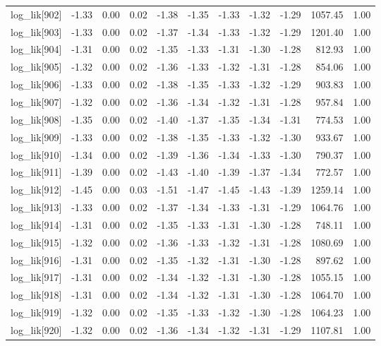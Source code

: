 \begin{table}[ht]
\begin{tabular}{rrrrrrrrrrr}
  log\_lik[902] & -1.33 & 0.00 & 0.02 & -1.38 & -1.35 & -1.33 & -1.32 & -1.29 & 1057.45 & 1.00 \\ 
  log\_lik[903] & -1.33 & 0.00 & 0.02 & -1.37 & -1.34 & -1.33 & -1.32 & -1.29 & 1201.40 & 1.00 \\ 
  log\_lik[904] & -1.31 & 0.00 & 0.02 & -1.35 & -1.33 & -1.31 & -1.30 & -1.28 & 812.93 & 1.00 \\ 
  log\_lik[905] & -1.32 & 0.00 & 0.02 & -1.36 & -1.33 & -1.32 & -1.31 & -1.28 & 854.06 & 1.00 \\ 
  log\_lik[906] & -1.33 & 0.00 & 0.02 & -1.38 & -1.35 & -1.33 & -1.32 & -1.29 & 903.83 & 1.00 \\ 
  log\_lik[907] & -1.32 & 0.00 & 0.02 & -1.36 & -1.34 & -1.32 & -1.31 & -1.28 & 957.84 & 1.00 \\ 
  log\_lik[908] & -1.35 & 0.00 & 0.02 & -1.40 & -1.37 & -1.35 & -1.34 & -1.31 & 774.53 & 1.00 \\ 
  log\_lik[909] & -1.33 & 0.00 & 0.02 & -1.38 & -1.35 & -1.33 & -1.32 & -1.30 & 933.67 & 1.00 \\ 
  log\_lik[910] & -1.34 & 0.00 & 0.02 & -1.39 & -1.36 & -1.34 & -1.33 & -1.30 & 790.37 & 1.00 \\ 
  log\_lik[911] & -1.39 & 0.00 & 0.02 & -1.43 & -1.40 & -1.39 & -1.37 & -1.34 & 772.57 & 1.00 \\ 
  log\_lik[912] & -1.45 & 0.00 & 0.03 & -1.51 & -1.47 & -1.45 & -1.43 & -1.39 & 1259.14 & 1.00 \\ 
  log\_lik[913] & -1.33 & 0.00 & 0.02 & -1.37 & -1.34 & -1.33 & -1.31 & -1.29 & 1064.76 & 1.00 \\ 
  log\_lik[914] & -1.31 & 0.00 & 0.02 & -1.35 & -1.33 & -1.31 & -1.30 & -1.28 & 748.11 & 1.00 \\ 
  log\_lik[915] & -1.32 & 0.00 & 0.02 & -1.36 & -1.33 & -1.32 & -1.31 & -1.28 & 1080.69 & 1.00 \\ 
  log\_lik[916] & -1.31 & 0.00 & 0.02 & -1.35 & -1.32 & -1.31 & -1.30 & -1.28 & 897.62 & 1.00 \\ 
  log\_lik[917] & -1.31 & 0.00 & 0.02 & -1.34 & -1.32 & -1.31 & -1.30 & -1.28 & 1055.15 & 1.00 \\ 
  log\_lik[918] & -1.31 & 0.00 & 0.02 & -1.34 & -1.32 & -1.31 & -1.30 & -1.28 & 1064.70 & 1.00 \\ 
  log\_lik[919] & -1.32 & 0.00 & 0.02 & -1.35 & -1.33 & -1.32 & -1.30 & -1.28 & 1064.23 & 1.00 \\ 
  log\_lik[920] & -1.32 & 0.00 & 0.02 & -1.36 & -1.34 & -1.32 & -1.31 & -1.29 & 1107.81 & 1.00 \\ 

\end{tabular}
\end{table}
